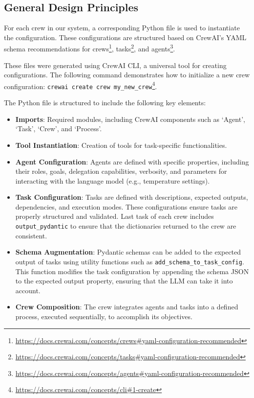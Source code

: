\subsection{General Design Principles}
\label{subsec:design_principles}

For each crew in our system, a corresponding Python file is used to instantiate the configuration. These configurations are structured based on CrewAI's YAML schema recommendations for crews\footnote{\url{https://docs.crewai.com/concepts/crews\#yaml-configuration-recommended}}, tasks\footnote{\url{https://docs.crewai.com/concepts/tasks\#yaml-configuration-recommended}}, and agents\footnote{\url{https://docs.crewai.com/concepts/agents\#yaml-configuration-recommended}}.

These files were generated using CrewAI CLI, a universal tool for creating configurations. The following command demonstrates how to initialize a new crew configuration:\newline
\texttt{crewai create crew my\_new\_crew}\footnote{\url{https://docs.crewai.com/concepts/cli\#1-create}}.

The Python file is structured to include the following key elements:

\begin{itemize}
    \item \textbf{Imports}: Required modules, including CrewAI components such as `Agent', `Task', `Crew', and `Process'.
    \item \textbf{Tool Instantiation}: Creation of tools for task-specific functionalities.
    \item \textbf{Agent Configuration}: Agents are defined with specific properties, including their roles, goals, delegation capabilities, verbosity, and parameters for interacting with the language model (e.g., temperature settings).
    \item \textbf{Task Configuration}: Tasks are defined with descriptions, expected outputs, dependencies, and execution modes. These configurations ensure tasks are properly structured and validated. Last task of each crew includes \texttt{output\_pydantic} to ensure that the dictionaries returned to the crew are consistent.
    \item \textbf{Schema Augmentation}: Pydantic schemas can be added to the expected output of tasks using utility functions such as \texttt{add\_schema\_to\_task\_config}. This function modifies the task configuration by appending the schema JSON to the expected output property, ensuring that the LLM can take it into account.
    \item \textbf{Crew Composition}: The crew integrates agents and tasks into a defined process, executed sequentially, to accomplish its objectives.
\end{itemize}


